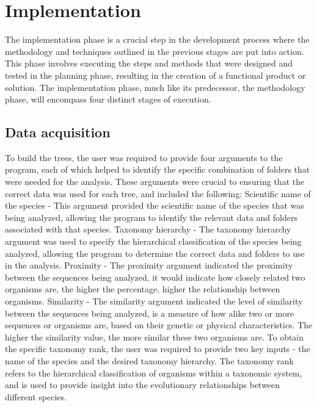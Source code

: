 \documentclass[12pt]{article}
\begin{document}
\section{Implementation}\label{sec:desenvolvimentos}
The implementation phase is a crucial step in the development process where the methodology and techniques outlined in the previous stages are put into action. This phase involves executing the steps and methods that were designed and tested in the planning phase, resulting in the creation of a functional product or solution. The implementation phase, much like its predecessor, the methodology phase, will encompass four distinct stages of execution.
\subsection{Data acquisition}
To build the trees, the user was required to provide four arguments to the program, each of which helped to identify the specific combination of folders that were needed for the analysis. These arguments were crucial to ensuring that the correct data was used for each tree, and included the following:\newline
Scientific name of the species - This argument provided the scientific name of the species that was being analyzed, allowing the program to identify the relevant data and folders associated with that species.\newline
Taxonomy hierarchy - The taxonomy hierarchy argument was used to specify the hierarchical classification of the species being analyzed, allowing the program to determine the correct data and folders to use in the analysis.\newpage
Proximity - The proximity argument indicated the proximity between the sequences being analyzed, it would indicate how closely related two organisms are, the higher the percentage, higher the relationship between organisms.\newline
Similarity - The similarity argument indicated the level of similarity between the sequences being analyzed, is a measure of how alike two or more sequences or organisms are, based on their genetic or physical characteristics. The higher the similarity value, the more similar these two organisms are.\newline
To obtain the specific taxonomy rank, the user was required to provide two key inputs - the name of the species and the desired taxonomy hierarchy. The taxonomy rank refers to the hierarchical classification of organisms within a taxonomic system, and is used to provide insight into the evolutionary relationships between different species.\newline
\end{document}

